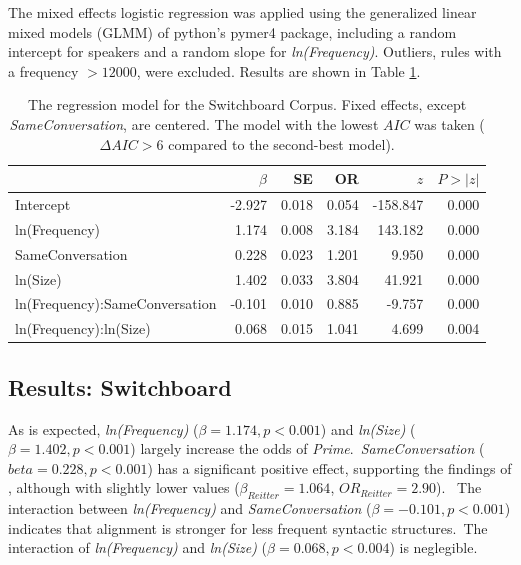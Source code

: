 \documentclass[11pt]{article}
\begin{document}
The mixed effects logistic regression was applied using the generalized linear mixed models (GLMM) of python's pymer4 package, including a random intercept for speakers and a random slope for \textit{ln(Frequency)}. Outliers, rules with a frequency $> 12000$, were excluded. Results are shown in Table \ref{tab:human}.

\begin{table}
  \centering
    \begin{tabular}{lrrrrr}
      \hline
      &$\beta$&SE&OR& $z$& $P>|z|$\\
      \hline
      Intercept&
      -2.927& 0.018& 0.054&  -158.847& 0.000\\
      
      ln(Frequency)&
      1.174& 0.008& 3.184& 143.182& 0.000\\
      
      SameConversation&
      0.228& 0.023& 1.201& 9.950& 0.000\\
      
      ln(Size)&
      1.402& 0.033& 3.804& 41.921& 0.000\\
      ln(Frequency):SameConversation&
      -0.101& 0.010& 0.885& -9.757& 0.000\\
      ln(Frequency):ln(Size)&
      0.068& 0.015& 1.041& 4.699& 0.004\\
      \hline
      
    \end{tabular}
  \caption{\label{tab:human}
  The regression model for the Switchboard Corpus. Fixed effects, except \textit{SameConversation}, are centered. The model with the lowest $AIC$ was taken ($\Delta AIC>6$ compared to the second-best model).}
    
\end{table}

\subsection{Results: Switchboard}
As is expected, \textit{ln(Frequency)} ($\beta=1.174, p<0.001$) and \textit{ln(Size)} ($\beta=1.402, p<0.001$) largely increase the odds of \textit{Prime}.\
\textit{SameConversation} ($beta=0.228, p<0.001$) has a significant positive effect, supporting the findings of \citealp{reitter2008context}, although with slightly lower values ($\beta_{Reitter}=1.064$, $OR_{Reitter} = 2.90$). \
The interaction between \textit{ln(Frequency)} and \textit{SameConversation} ($\beta=-0.101, p<0.001$) indicates that alignment is stronger for less frequent syntactic structures.\
The interaction of \textit{ln(Frequency)} and \textit{ln(Size)} ($\beta=0.068, p<0.004$) is neglegible.
\end{document}
